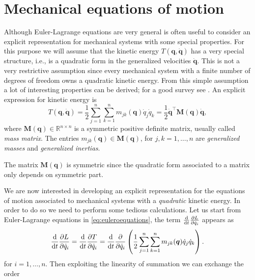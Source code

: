 	\section{Mechanical equations of motion}
		
		Although Euler-Lagrange equations are very general is often useful 
		to consider an explicit representation for mechanical systems with some 
		special properties.
		For this purpose we will assume that the kinetic energy $T(\bm{q},\dot{\bm{q}})$
		has a very special structure, i.e., is a quadratic form in the generalized
		velocities $\dot{\bm{q}}$.
		This is not a very restrictive assumption since every mechanical system with
		a finite number of degrees of freedom owns a quadratic kinetic energy.
		From this simple assumption a lot of interesting properties can be derived;
		for a good survey see \cite{siciliano2009robotics}.
		An explicit expression for kinetic energy is
		\begin{equation}
			T(\bm{q},\dot{\bm{q}}) = 
			\frac{1}{2}\sum_{j=1}^{n}\sum_{k=1}^{n}m_{jk}(\bm{q})\dot{q}_{j}\dot{q}_{k}
			= \frac{1}{2}\dot{\bm{q}}^{\intercal}\bm{M}(\bm{q})\dot{\bm{q}},
		\end{equation}
		where $\bm{M}(\bm{q})\in\mathbb{R}^{n\times n}$ is a symmetric positive definite matrix,
		usually called \emph{mass matrix}.
		The entries $m_{jk}(\bm{q})\in\bm{M}(\bm{q})$, for $j,k=1,\dots,n$ are
		\emph{generalized masses} and \emph{generalized inertias}.
		\begin{remark}
			The matrix $\bm{M}(\bm{q})$ is symmetric since the quadratic
			form associated to a matrix only depends on symmetric part.
		\end{remark}
		We are now interested in developing an explicit representation for the
		equations of motion associated to mechanical systems with a \emph{quadratic} kinetic energy.
		In order to do so we need to perform some tedious calculations.
		Let us start from Euler-Lagrange equations in \cref{eq:euleroequations},
		the term $\frac{\mathop{}\!\mathrm{d}}{\mathop{}\!\mathrm{d} t}\frac{\partial L}{\partial \dot{q}_{i}}$ appears as
		\begin{equation*}
			\frac{\mathop{}\!\mathrm{d}}{\mathop{}\!\mathrm{d} t}\frac{\partial L}{\partial \dot{q}_{i}}
			= \frac{\mathop{}\!\mathrm{d}}{\mathop{}\!\mathrm{d} t}\frac{\partial T}{\partial \dot{q}_{i}}
			= \frac{\mathop{}\!\mathrm{d}}{\mathop{}\!\mathrm{d} t}\frac{\partial}{\partial\dot{q}_{i}}
			\left(\frac{1}{2}\sum_{j=1}^{n}\sum_{k=1}^{n}m_{jk}(\bm{q})\dot{q}_{j}\dot{q}_{k}\right).
		\end{equation*}
		for $i = 1,\dots,n$.
		Then exploiting the linearity of summation we can exchange the order
